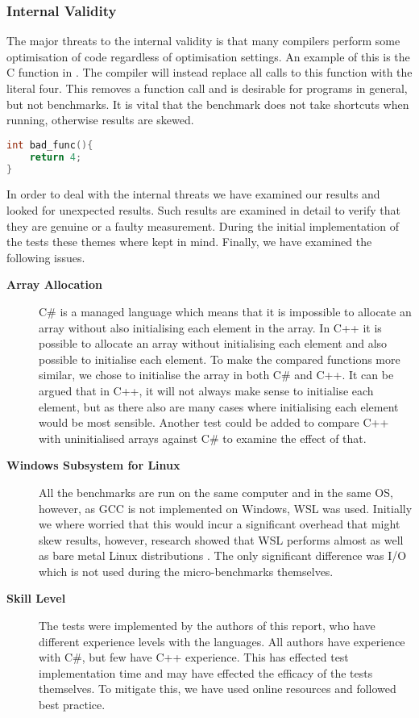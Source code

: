 \subsubsection{Internal Validity}
The major threats to the internal validity is that many compilers perform some optimisation of code regardless of optimisation settings. An example of this is the C function in . The compiler will instead replace all calls to this function with the literal four. This removes a function call and is desirable for programs in general, but not benchmarks. It is vital that the benchmark does not take shortcuts when running, otherwise results are skewed.

\begin{lstlisting}[language=C,label={lst:bad-c},caption={An example of Function Inlining}]
int bad_func(){
    return 4;
}
\end{lstlisting}

In order to deal with the internal threats we have examined our results and looked for unexpected results. Such results are examined in detail to verify that they are genuine or a faulty measurement. During the initial implementation of the tests these themes where kept in mind. Finally, we have examined the following issues.

\begin{description}
    \item[\textbf{Array Allocation}]
    C\# is a managed language which means that it is impossible to allocate an array without also initialising each element in the array. In C++ it is possible to allocate an array without initialising each element and also possible to initialise each element. To make the compared functions more similar, we chose to initialise the array in both C\# and C++. It can be argued that in C++, it will not always make sense to initialise each element, but as there also are many cases where initialising each element would be most sensible. Another test could be added to compare C++ with uninitialised arrays against C\# to examine the effect of that.
    \item[\textbf{Windows Subsystem for Linux}]
    All the benchmarks are run on the same computer and in the same \ac{OS}, however, as \ac{GCC} is not implemented on Windows, \ac{WSL} was used. Initially we where worried that this would incur a significant overhead that might skew results, however, research showed that \ac{WSL} performs almost as well as bare metal Linux distributions \cite{phoronix:wslperformance}. The only significant difference was \ac{I/O} which is not used during the micro-benchmarks themselves.
    \item[\textbf{Skill Level}]
    The tests were implemented by the authors of this report, who have different experience levels with the languages. All authors have experience with C\#, but few have C++ experience. This has effected test implementation time and may have effected the efficacy of the tests themselves. To mitigate this, we have used online resources and followed best practice.
\end{description}

